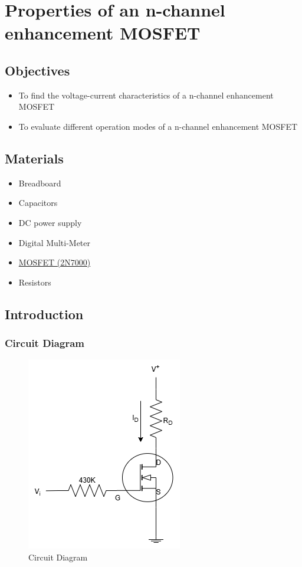 \chapter{Properties of an n-channel enhancement MOSFET}


\section{Objectives}
\begin{itemize}
    \item To find the voltage-current characteristics of a n-channel enhancement MOSFET
    \item To evaluate different operation modes of a n-channel enhancement MOSFET
\end{itemize}

\section{Materials}
\begin{itemize}
    \item Breadboard
    \item Capacitors
    \item DC power supply
    \item Digital Multi-Meter
    \item \hyperref[2N7000_1]{MOSFET (2N7000)}
    \item Resistors
\end{itemize}

\section{Introduction}
    \subsection{Circuit Diagram}
    \begin{figure}[h]
        \centering
        \includegraphics[width=0.65\linewidth]{Lab08/Lab8.drawio.png}
        \caption{Circuit Diagram}
        \label{l8f}
    \end{figure}
    \FloatBarrier

